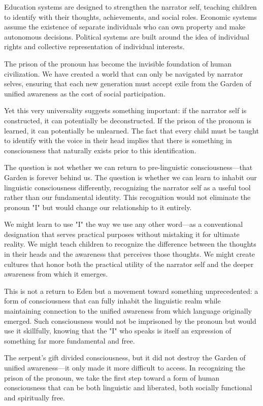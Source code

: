 Education systems are designed to strengthen the narrator self, teaching children to identify with their thoughts, achievements, and social roles. Economic systems assume the existence of separate individuals who can own property and make autonomous decisions. Political systems are built around the idea of individual rights and collective representation of individual interests.

The prison of the pronoun has become the invisible foundation of human civilization. We have created a world that can only be navigated by narrator selves, ensuring that each new generation must accept exile from the Garden of unified awareness as the cost of social participation.

Yet this very universality suggests something important: if the narrator self is constructed, it can potentially be deconstructed. If the prison of the pronoun is learned, it can potentially be unlearned. The fact that every child must be taught to identify with the voice in their head implies that there is something in consciousness that naturally exists prior to this identification.

The question is not whether we can return to pre-linguistic consciousness—that Garden is forever behind us. The question is whether we can learn to inhabit our linguistic consciousness differently, recognizing the narrator self as a useful tool rather than our fundamental identity. This recognition would not eliminate the pronoun "I" but would change our relationship to it entirely.

We might learn to use "I" the way we use any other word—as a conventional designation that serves practical purposes without mistaking it for ultimate reality. We might teach children to recognize the difference between the thoughts in their heads and the awareness that perceives those thoughts. We might create cultures that honor both the practical utility of the narrator self and the deeper awareness from which it emerges.

This is not a return to Eden but a movement toward something unprecedented: a form of consciousness that can fully inhabit the linguistic realm while maintaining connection to the unified awareness from which language originally emerged. Such consciousness would not be imprisoned by the pronoun but would use it skillfully, knowing that the "I" who speaks is itself an expression of something far more fundamental and free.

The serpent's gift divided consciousness, but it did not destroy the Garden of unified awareness—it only made it more difficult to access. In recognizing the prison of the pronoun, we take the first step toward a form of human consciousness that can be both linguistic and liberated, both socially functional and spiritually free.
